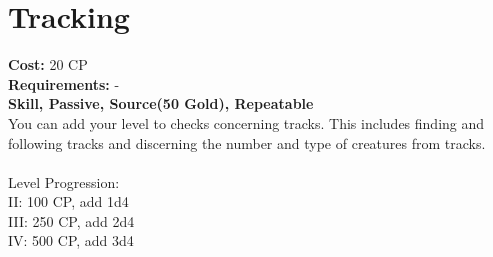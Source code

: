 \section{Tracking}
\textbf{Cost:} 20 CP\\
\textbf{Requirements:} -\\
\textbf{Skill, Passive, Source(50 Gold), Repeatable}\\
You can add your level to checks concerning tracks. This includes finding and following tracks and discerning the number and type of creatures from tracks.\\
\\
Level Progression:\\
II: 100 CP, add 1d4\\
III: 250 CP, add 2d4\\
IV: 500 CP, add 3d4\\